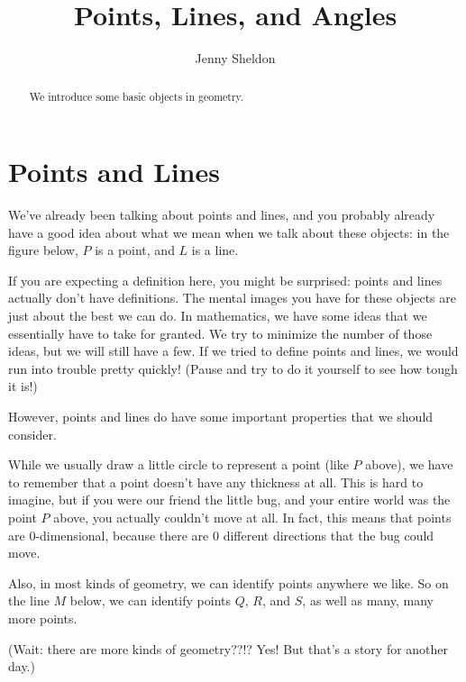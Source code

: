 \documentclass{ximera}
\title{Points, Lines, and Angles}
\author{Jenny Sheldon}
\begin{document}
\begin{abstract}
We introduce some basic objects in geometry.
\end{abstract}
\maketitle

\section{Points and Lines}

We've already been talking about points and lines, and you probably already have a good idea about what we mean when we talk about these objects: in the figure below, $P$ is a point, and $L$ is a line. 
\begin{image}
\end{image}

If you are expecting a definition here, you might be surprised: points and lines actually don't have definitions. The mental images you have for these objects are just about the best we can do. In mathematics, we have some ideas that we essentially have to take for granted. We try to minimize the number of those ideas, but we will still have a few. If we tried to define points and lines, we would run into trouble pretty quickly! (Pause and try to do it yourself to see how tough it is!)

However, points and lines do have some important properties that we should consider.

While we usually draw a little circle to represent a point (like $P$ above), we have to remember that a point doesn't have any thickness at all. This is hard to imagine, but if you were our friend the little bug, and your entire world was the point $P$ above, you actually couldn't move at all. In fact, this means that points are $0$-dimensional, because there are $0$ different directions that the bug could move.

Also, in most kinds of geometry, we can identify points anywhere we like. So on the line $M$ below, we can identify points $Q$, $R$, and $S$, as well as many, many more points. 
\begin{image}
\end{image}
(Wait: there are more kinds of geometry??!? Yes! But that's a story for another day.)
\end{document}
